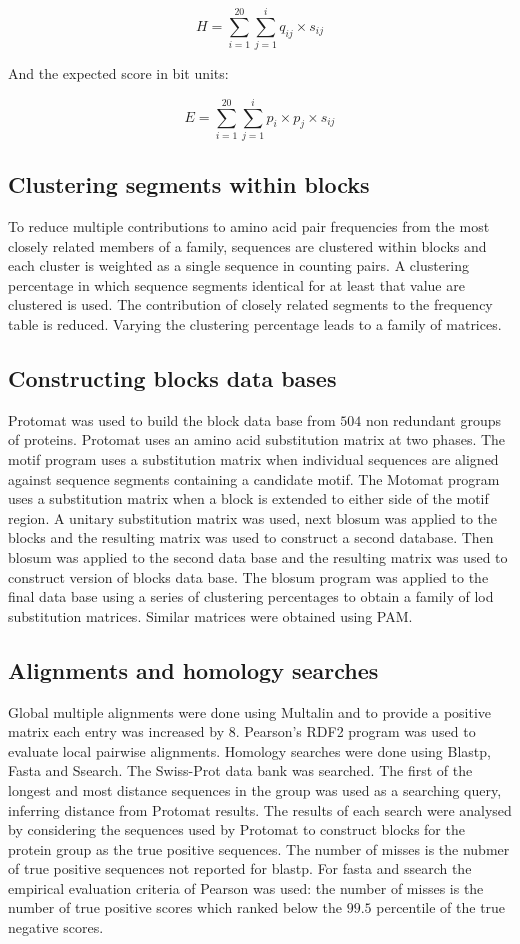 	$$ H = \sum\limits_{i=1}^{20}\sum\limits_{j=1}^i q_{ij}\times s_{ij}$$

	And the expected score in bit units:

	$$E = \sum\limits_{i=1}^{20}\sum\limits_{j=1}^i p_i\times p_j\times s_{ij}$$

	\subsection{Clustering segments within blocks}
	To reduce multiple contributions to amino acid pair frequencies from the most closely related members of a family, sequences are clustered within blocks and each cluster is weighted as a single sequence in counting pairs.
	A clustering percentage in which sequence segments identical for at least that value are clustered is used.
	The contribution of closely related segments to the frequency table is reduced.
	Varying the clustering percentage leads to a family of matrices.

	\subsection{Constructing blocks data bases}
	Protomat was used to build the block data base from $504$ non redundant groups of proteins.
	Protomat uses an amino acid substitution matrix at two phases.
	The motif program uses a substitution matrix when individual sequences are aligned against sequence segments containing a candidate motif.
	The Motomat program uses a substitution matrix when a block is extended to either side of the motif region.
	A unitary substitution matrix was used, next blosum was applied to the blocks and the resulting matrix was used to construct a second database.
	Then blosum was applied to the second data base and the resulting matrix was used to construct version of blocks data base.
	The blosum program was applied to the final data base using a series of clustering percentages to obtain a family of lod substitution matrices.
	Similar matrices were obtained using PAM.

	\subsection{Alignments and homology searches}
	Global multiple alignments were done using Multalin and to provide a positive matrix each entry was increased by $8$.
	Pearson's RDF2 program was used to evaluate local pairwise alignments.
	Homology searches were done using Blastp, Fasta and Ssearch.
	The Swiss-Prot data bank was searched.
	The first of the longest and most distance sequences in the group was used as a searching query, inferring distance from Protomat results.
	The results of each search were analysed by considering the sequences used by Protomat to construct blocks for the protein group as the true positive sequences.
	The number of misses is the nubmer of true positive sequences not reported for blastp.
	For fasta and ssearch the empirical evaluation criteria of Pearson was used: the number of misses is the number of true positive scores which ranked below the $99.5$ percentile of the true negative scores.

